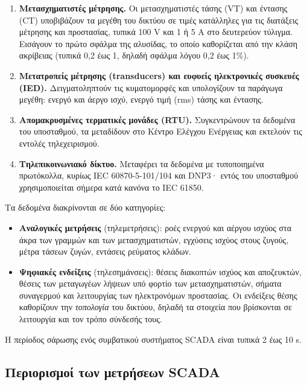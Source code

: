 \begin{enumerate}
\item \textbf{Μετασχηματιστές μέτρησης.} Οι μετασχηματιστές τάσης (VT) και έντασης (CT)
      υποβιβάζουν τα μεγέθη του δικτύου σε τιμές κατάλληλες για τις διατάξεις μέτρησης
      και προστασίας, τυπικά 100 V και 1 ή 5 A στο δευτερεύον τύλιγμα. Εισάγουν το πρώτο
      σφάλμα της αλυσίδας, το οποίο καθορίζεται από την κλάση ακρίβειας (τυπικά 0,2 έως 1,
      δηλαδή σφάλμα λόγου 0,2 έως 1\%).
\item \textbf{Μετατροπείς μέτρησης (transducers) και ευφυείς ηλεκτρονικές συσκευές (IED).}
      Δειγματοληπτούν τις κυματομορφές και υπολογίζουν τα παράγωγα μεγέθη: ενεργό και
      άεργο ισχύ, ενεργό τιμή (rms) τάσης και έντασης.
\item \textbf{Απομακρυσμένες τερματικές μονάδες (RTU).} Συγκεντρώνουν τα δεδομένα του
      υποσταθμού, τα μεταδίδουν στο Κέντρο Ελέγχου Ενέργειας και εκτελούν τις εντολές
      τηλεχειρισμού.
\item \textbf{Τηλεπικοινωνιακό δίκτυο.} Μεταφέρει τα δεδομένα με τυποποιημένα πρωτόκολλα,
      κυρίως IEC 60870-5-101/104 και DNP3· εντός του υποσταθμού χρησιμοποιείται σήμερα
      κατά κανόνα το IEC 61850.
\end{enumerate}

Τα δεδομένα διακρίνονται σε δύο κατηγορίες:

\begin{itemize}
\item \textbf{Αναλογικές μετρήσεις} (τηλεμετρήσεις): ροές ενεργού και αέργου ισχύος στα
      άκρα των γραμμών και των μετασχηματιστών, εγχύσεις ισχύος στους ζυγούς, μέτρα τάσεων
      ζυγών, εντάσεις ρεύματος κλάδων.
\item \textbf{Ψηφιακές ενδείξεις} (τηλεσημάνσεις): θέσεις διακοπτών ισχύος και αποζευκτών,
      θέσεις των μεταγωγέων λήψεων υπό φορτίο των μετασχηματιστών, σήματα συναγερμού και
      λειτουργίας των ηλεκτρονόμων προστασίας. Οι ενδείξεις θέσης καθορίζουν την
      \emph{τοπολογία} του δικτύου, δηλαδή τα στοιχεία που βρίσκονται σε λειτουργία και τον
      τρόπο σύνδεσής τους.
\end{itemize}

Η περίοδος σάρωσης ενός συμβατικού συστήματος SCADA είναι τυπικά 2 έως 10 s.

\subsection{Περιορισμοί των μετρήσεων SCADA}

